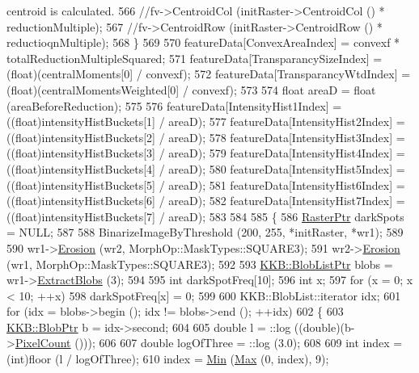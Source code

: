 \begin{DoxyCode}
{       centroid is calculated.}
566     \textcolor{comment}{//fv->CentroidCol (initRaster->CentroidCol () * reductionMultiple);}
567     \textcolor{comment}{//fv->CentroidRow (initRaster->CentroidRow () * reductioqnMultiple);}
568   \}
569 
570   featureData[ConvexAreaIndex]       = convexf * totalReductionMultipleSquared;
571   featureData[TransparancySizeIndex] = (float)(centralMoments[0] / convexf);
572   featureData[TransparancyWtdIndex]  = (float)(centralMomentsWeighted[0] / convexf);
573 
574   \textcolor{keywordtype}{float}  areaD = float (areaBeforeReduction);
575 
576   featureData[IntensityHist1Index] = ((float)intensityHistBuckets[1] / areaD);
577   featureData[IntensityHist2Index] = ((float)intensityHistBuckets[2] / areaD);
578   featureData[IntensityHist3Index] = ((float)intensityHistBuckets[3] / areaD);
579   featureData[IntensityHist4Index] = ((float)intensityHistBuckets[4] / areaD);
580   featureData[IntensityHist5Index] = ((float)intensityHistBuckets[5] / areaD);
581   featureData[IntensityHist6Index] = ((float)intensityHistBuckets[6] / areaD);
582   featureData[IntensityHist7Index] = ((float)intensityHistBuckets[7] / areaD);
583 
584 
585   \{
586     \hyperlink{class_k_k_b_1_1_raster}{RasterPtr}  darkSpots = NULL;
587 
588     BinarizeImageByThreshold (200, 255, *initRaster, *wr1); 
589    
590     wr1->\hyperlink{class_k_k_b_1_1_raster_a5a019718e60c06c4262e8127232ff19c}{Erosion} (wr2, MorphOp::MaskTypes::SQUARE3);
591     wr2->\hyperlink{class_k_k_b_1_1_raster_a5a019718e60c06c4262e8127232ff19c}{Erosion} (wr1, MorphOp::MaskTypes::SQUARE3);
592 
593     \hyperlink{class_k_k_b_1_1_blob_list}{KKB::BlobListPtr}  blobs = wr1->\hyperlink{class_k_k_b_1_1_raster_a5d6059f6d0020e493683b2a00a6a8821}{ExtractBlobs} (3);
594 
595     \textcolor{keywordtype}{int}  darkSpotFreq[10];
596     \textcolor{keywordtype}{int} x;
597     \textcolor{keywordflow}{for}  (x = 0;  x < 10;  ++x)
598       darkSpotFreq[x] = 0;
599 
600     KKB::BlobList::iterator  idx;
601     \textcolor{keywordflow}{for}  (idx = blobs->begin ();  idx != blobs->end ();  ++idx)
602     \{
603       \hyperlink{class_k_k_b_1_1_blob}{KKB::BlobPtr}  b = idx->second;
604 
605       \textcolor{keywordtype}{double} l =  ::log ((\textcolor{keywordtype}{double})(b->\hyperlink{class_k_k_b_1_1_blob_a5b3f9098a889a0def5eb49287284b847}{PixelCount} ()));
606 
607       \textcolor{keywordtype}{double} logOfThree = ::log (3.0);
608 
609       \textcolor{keywordtype}{int}  index = (int)floor (l / logOfThree);
610       index = \hyperlink{_raster_8cpp_a6261a282d8ed27242c636ad5fb658585}{Min} (\hyperlink{namespace_k_k_b_a25e187e24c091586293725f27f007ad7}{Max} (0, index), 9);

\end{DoxyCode}
